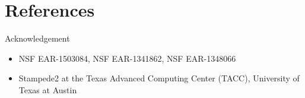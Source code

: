 \documentclass[13pt,aspectratio=169]{beamer}
\begin{document}
\section{References}
\begin{frame}[allowframebreaks]{\secname}
	
	
\end{frame}

\begin{frame}{Acknowledgement}
	\begin{itemize}
		\item NSF EAR-1503084, NSF EAR-1341862, NSF EAR-1348066
		\item Stampede2 at the Texas Advanced Computing Center (TACC), University of Texas at Austin
	\end{itemize}
\end{frame}
\end{document}
